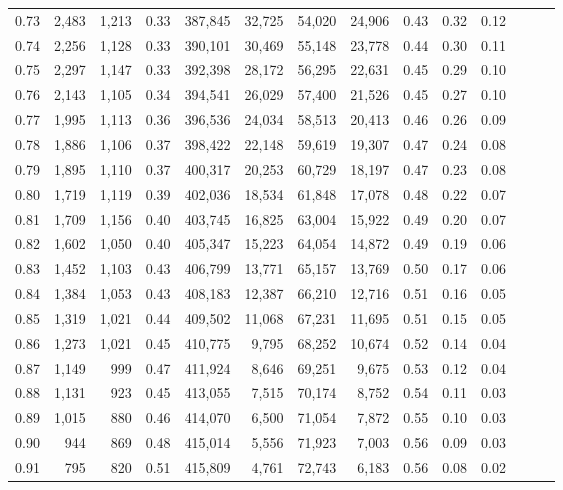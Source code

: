 \begin{tabular}{rrrrrrrrrrrrrr}
0.73 &  2,483 &  1,213 &  0.33 &  387,845 &   32,725 &  54,020 &  24,906 &  0.43 &  0.32 &      0.12 \\
0.74 &  2,256 &  1,128 &  0.33 &  390,101 &   30,469 &  55,148 &  23,778 &  0.44 &  0.30 &      0.11 \\
0.75 &  2,297 &  1,147 &  0.33 &  392,398 &   28,172 &  56,295 &  22,631 &  0.45 &  0.29 &      0.10 \\
0.76 &  2,143 &  1,105 &  0.34 &  394,541 &   26,029 &  57,400 &  21,526 &  0.45 &  0.27 &      0.10 \\
0.77 &  1,995 &  1,113 &  0.36 &  396,536 &   24,034 &  58,513 &  20,413 &  0.46 &  0.26 &      0.09 \\
0.78 &  1,886 &  1,106 &  0.37 &  398,422 &   22,148 &  59,619 &  19,307 &  0.47 &  0.24 &      0.08 \\
0.79 &  1,895 &  1,110 &  0.37 &  400,317 &   20,253 &  60,729 &  18,197 &  0.47 &  0.23 &      0.08 \\
0.80 &  1,719 &  1,119 &  0.39 &  402,036 &   18,534 &  61,848 &  17,078 &  0.48 &  0.22 &      0.07 \\
0.81 &  1,709 &  1,156 &  0.40 &  403,745 &   16,825 &  63,004 &  15,922 &  0.49 &  0.20 &      0.07 \\
0.82 &  1,602 &  1,050 &  0.40 &  405,347 &   15,223 &  64,054 &  14,872 &  0.49 &  0.19 &      0.06 \\
0.83 &  1,452 &  1,103 &  0.43 &  406,799 &   13,771 &  65,157 &  13,769 &  0.50 &  0.17 &      0.06 \\
0.84 &  1,384 &  1,053 &  0.43 &  408,183 &   12,387 &  66,210 &  12,716 &  0.51 &  0.16 &      0.05 \\
0.85 &  1,319 &  1,021 &  0.44 &  409,502 &   11,068 &  67,231 &  11,695 &  0.51 &  0.15 &      0.05 \\
0.86 &  1,273 &  1,021 &  0.45 &  410,775 &    9,795 &  68,252 &  10,674 &  0.52 &  0.14 &      0.04 \\
0.87 &  1,149 &    999 &  0.47 &  411,924 &    8,646 &  69,251 &   9,675 &  0.53 &  0.12 &      0.04 \\
0.88 &  1,131 &    923 &  0.45 &  413,055 &    7,515 &  70,174 &   8,752 &  0.54 &  0.11 &      0.03 \\
0.89 &  1,015 &    880 &  0.46 &  414,070 &    6,500 &  71,054 &   7,872 &  0.55 &  0.10 &      0.03 \\
0.90 &    944 &    869 &  0.48 &  415,014 &    5,556 &  71,923 &   7,003 &  0.56 &  0.09 &      0.03 \\
0.91 &    795 &    820 &  0.51 &  415,809 &    4,761 &  72,743 &   6,183 &  0.56 &  0.08 &      0.02 \\

\end{tabular}
